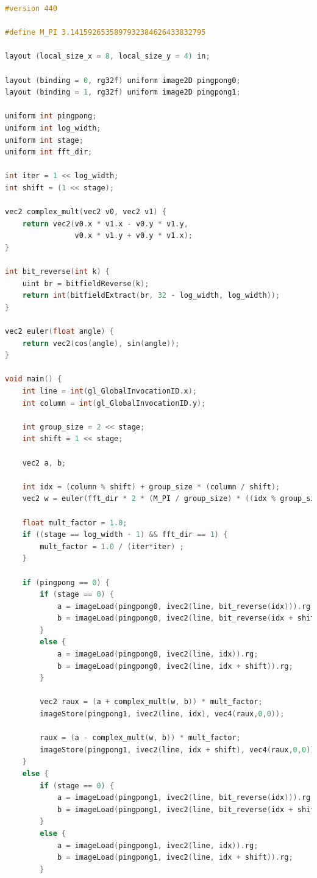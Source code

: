 \documentclass[
  oneside,
  11pt, a4paper,
  footinclude=true,
  headinclude=true,
  cleardoublepage=empty
]{scrbook}
\begin{document}

\begin{lstlisting}[language=C,caption={FFT Radix-2 Cooley-Tukey Vertical stage pass, see \autoref{sec:ct-impl}},label={lst:glsl-radix2-ct-stage-vertical}]
#version 440

#define M_PI 3.1415926535897932384626433832795

layout (local_size_x = 8, local_size_y = 4) in;

layout (binding = 0, rg32f) uniform image2D pingpong0;
layout (binding = 1, rg32f) uniform image2D pingpong1;

uniform int pingpong;
uniform int log_width;
uniform int stage;
uniform int fft_dir;

int iter = 1 << log_width;
int shift = (1 << stage);

vec2 complex_mult(vec2 v0, vec2 v1) {
	return vec2(v0.x * v1.x - v0.y * v1.y,
				v0.x * v1.y + v0.y * v1.x);
}

int bit_reverse(int k) {
    uint br = bitfieldReverse(k);
    return int(bitfieldExtract(br, 32 - log_width, log_width));
}

vec2 euler(float angle) {
	return vec2(cos(angle), sin(angle));
}

void main() {
	int line = int(gl_GlobalInvocationID.x);
	int column = int(gl_GlobalInvocationID.y);

	int group_size = 2 << stage;
	int shift = 1 << stage;

	vec2 a, b;

    int idx = (column % shift) + group_size * (column / shift);
    vec2 w = euler(fft_dir * 2 * (M_PI / group_size) * ((idx % group_size) % shift));

    float mult_factor = 1.0;
    if ((stage == log_width - 1) && fft_dir == 1) {
        mult_factor = 1.0 / (iter*iter) ;
    }

    if (pingpong == 0) {
        if (stage == 0) {
            a = imageLoad(pingpong0, ivec2(line, bit_reverse(idx))).rg;
            b = imageLoad(pingpong0, ivec2(line, bit_reverse(idx + shift))).rg;
        }
        else {
            a = imageLoad(pingpong0, ivec2(line, idx)).rg;
            b = imageLoad(pingpong0, ivec2(line, idx + shift)).rg;
        }
        
        vec2 raux = (a + complex_mult(w, b)) * mult_factor;
        imageStore(pingpong1, ivec2(line, idx), vec4(raux,0,0));
            
        raux = (a - complex_mult(w, b)) * mult_factor;
        imageStore(pingpong1, ivec2(line, idx + shift), vec4(raux,0,0));
    }
    else {
        if (stage == 0) {
            a = imageLoad(pingpong1, ivec2(line, bit_reverse(idx))).rg;
            b = imageLoad(pingpong1, ivec2(line, bit_reverse(idx + shift))).rg;
        }
        else {	
            a = imageLoad(pingpong1, ivec2(line, idx)).rg;
            b = imageLoad(pingpong1, ivec2(line, idx + shift)).rg;
        }


\end{lstlisting}
\end{document}
